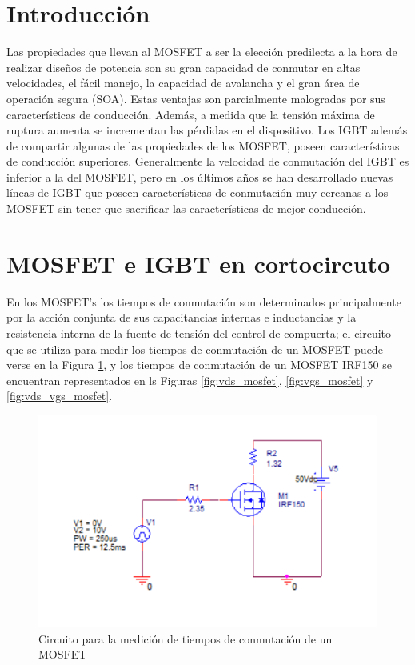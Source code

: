 \documentclass[conference]{IEEEtran}
\begin{document}
\section{Introducción}
\label{sec:intro}
Las propiedades que llevan al MOSFET a ser la elección predilecta a la hora de realizar diseños de potencia son su gran capacidad de conmutar en altas velocidades, el fácil manejo, la capacidad de avalancha y el gran área de operación segura (SOA). Estas ventajas son parcialmente malogradas por sus características de conducción. Además, a medida que la tensión máxima de ruptura aumenta se incrementan las pérdidas en el dispositivo. Los IGBT además de compartir algunas de las propiedades de los MOSFET, poseen características de conducción superiores. Generalmente la velocidad de conmutación del IGBT es inferior a la del MOSFET, pero en los últimos años se han desarrollado nuevas líneas de IGBT que poseen características de conmutación muy cercanas a los MOSFET sin tener que sacrificar las características de mejor conducción. 

\section{MOSFET e IGBT en cortocircuto}
En los MOSFET's los tiempos de conmutación son determinados principalmente por la acción conjunta de sus capacitancias internas e inductancias y la resistencia interna de la fuente de tensión del control de compuerta; el circuito que se utiliza para medir los tiempos de conmutación de un MOSFET puede verse en la Figura \ref{fig:circuit_mosfet}, y los tiempos de conmutación de un MOSFET IRF150 se encuentran representados en ls Figuras \ref{fig:vds_mosfet}, \ref{fig:vgs_mosfet} y \ref{fig:vds_vgs_mosfet}.

\begin{figure}[H]
	\centering
	\includegraphics[width=\columnwidth]{imagenes/circuit_mosfet}
	\caption{Circuito para la medición de tiempos de conmutación de un MOSFET}
	\label{fig:circuit_mosfet}
\end{figure}
\end{document}
